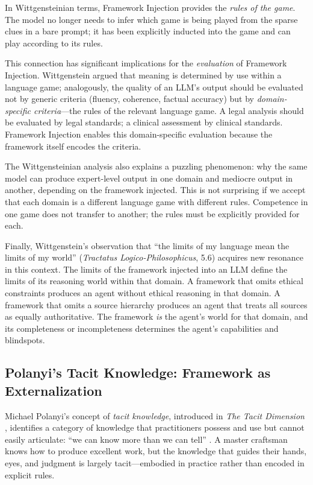 \documentclass[12pt,a4paper]{article}
\begin{document}
In Wittgensteinian terms, Framework Injection provides the \emph{rules of the game}. The model no longer needs to infer which game is being played from the sparse clues in a bare prompt; it has been explicitly inducted into the game and can play according to its rules.

This connection has significant implications for the \emph{evaluation} of Framework Injection. Wittgenstein argued that meaning is determined by use within a language game; analogously, the quality of an LLM's output should be evaluated not by generic criteria (fluency, coherence, factual accuracy) but by \emph{domain-specific criteria}---the rules of the relevant language game. A legal analysis should be evaluated by legal standards; a clinical assessment by clinical standards. Framework Injection enables this domain-specific evaluation because the framework itself encodes the criteria.

The Wittgensteinian analysis also explains a puzzling phenomenon: why the same model can produce expert-level output in one domain and mediocre output in another, depending on the framework injected. This is not surprising if we accept that each domain is a different language game with different rules. Competence in one game does not transfer to another; the rules must be explicitly provided for each.

Finally, Wittgenstein's observation that ``the limits of my language mean the limits of my world'' (\emph{Tractatus Logico-Philosophicus}, 5.6) acquires new resonance in this context. The limits of the framework injected into an LLM define the limits of its reasoning world within that domain. A framework that omits ethical constraints produces an agent without ethical reasoning in that domain. A framework that omits a source hierarchy produces an agent that treats all sources as equally authoritative. The framework \emph{is} the agent's world for that domain, and its completeness or incompleteness determines the agent's capabilities and blindspots.

\subsection{Polanyi's Tacit Knowledge: Framework as Externalization}
\label{sec:theory:polanyi}

Michael Polanyi's concept of \emph{tacit knowledge}, introduced in \emph{The Tacit Dimension} \citep{polanyi1966tacit}, identifies a category of knowledge that practitioners possess and use but cannot easily articulate: ``we can know more than we can tell'' \citep[p.~4]{polanyi1966tacit}. A master craftsman knows how to produce excellent work, but the knowledge that guides their hands, eyes, and judgment is largely tacit---embodied in practice rather than encoded in explicit rules.
\end{document}
